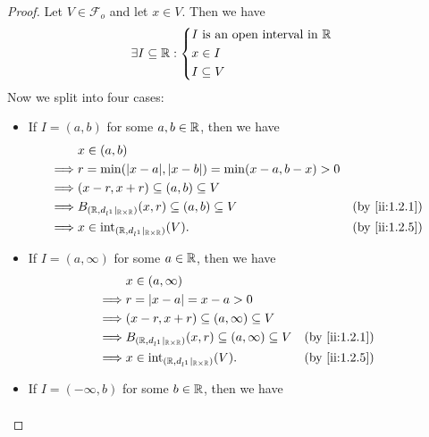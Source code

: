 \begin{proof}
  Let \(V \in \mathcal{F}_o\) and let \(x \in V\).
  Then we have
  \[
    \exists I \subseteq \mathbb{R} : \begin{dcases}
      I \text{ is an open interval in } \mathbb{R} \\
      x \in I                              \\
      I \subseteq V
    \end{dcases}
  \]
  Now we split into four cases:
  \begin{itemize}
    \item If \(I = (a, b)\) for some \(a, b \in \mathbb{R}\), then we have
          \begin{align*}
                     & x \in (a, b)                                                                            \\
            \implies & r = \min(\abs{x - a}, \abs{x - b}) = \min(x - a, b - x) > 0                             \\
            \implies & (x - r, x + r) \subseteq (a, b) \subseteq V                                             \\
            \implies & B_{(\R, d_{l^1}|_{\R \times \R})}(x, r) \subseteq (a, b) \subseteq V &  & \by{ii:1.2.1} \\
            \implies & x \in \text{int}_{(\R, d_{l^1}|_{\R \times \R})}(V).                 &  & \by{ii:1.2.5}
          \end{align*}
    \item If \(I = (a, \infty)\) for some \(a \in \mathbb{R}\), then we have
          \begin{align*}
                     & x \in (a, \infty)                                                                            \\
            \implies & r = \abs{x - a} = x - a > 0                                                                  \\
            \implies & (x - r, x + r) \subseteq (a, \infty) \subseteq V                                             \\
            \implies & B_{(\R, d_{l^1}|_{\R \times \R})}(x, r) \subseteq (a, \infty) \subseteq V &  & \by{ii:1.2.1} \\
            \implies & x \in \text{int}_{(\R, d_{l^1}|_{\R \times \R})}(V).                      &  & \by{ii:1.2.5}
          \end{align*}
    \item If \(I = (-\infty, b)\) for some \(b \in \mathbb{R}\), then we have
          \begin{align*}

\end{align*}
\end{itemize}
\end{proof}
